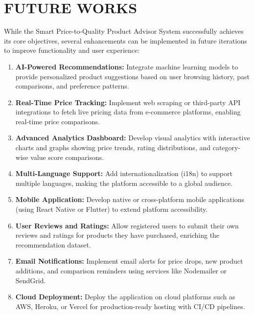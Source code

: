 \chapter{FUTURE WORKS}

While the Smart Price-to-Quality Product Advisor System successfully achieves its core objectives, several enhancements can be implemented in future iterations to improve functionality and user experience:

\begin{enumerate}
    \item \textbf{AI-Powered Recommendations:} Integrate machine learning models to provide personalized product suggestions based on user browsing history, past comparisons, and preference patterns.

    \item \textbf{Real-Time Price Tracking:} Implement web scraping or third-party API integrations to fetch live pricing data from e-commerce platforms, enabling real-time price comparisons.

    \item \textbf{Advanced Analytics Dashboard:} Develop visual analytics with interactive charts and graphs showing price trends, rating distributions, and category-wise value score comparisons.

    \item \textbf{Multi-Language Support:} Add internationalization (i18n) to support multiple languages, making the platform accessible to a global audience.

    \item \textbf{Mobile Application:} Develop native or cross-platform mobile applications (using React Native or Flutter) to extend platform accessibility.

    \item \textbf{User Reviews and Ratings:} Allow registered users to submit their own reviews and ratings for products they have purchased, enriching the recommendation dataset.

    \item \textbf{Email Notifications:} Implement email alerts for price drops, new product additions, and comparison reminders using services like Nodemailer or SendGrid.

    \item \textbf{Cloud Deployment:} Deploy the application on cloud platforms such as AWS, Heroku, or Vercel for production-ready hosting with CI/CD pipelines.
\end{enumerate}